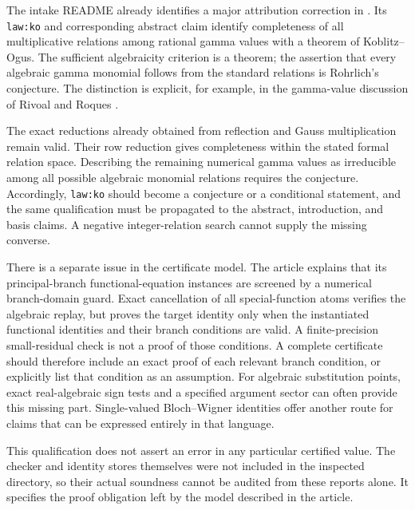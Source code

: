 The intake README already identifies a major attribution correction
in .  Its \texttt{law:ko}
and corresponding abstract claim identify completeness of all
multiplicative relations among rational gamma values with a theorem
of Koblitz--Ogus.  The sufficient algebraicity criterion is a theorem;
the assertion that every algebraic gamma monomial follows from the
standard relations is Rohrlich's conjecture.  The distinction is
explicit, for example, in the gamma-value discussion of
Rivoal and Roques \cite{RivoalRoques2014}.

The exact reductions already obtained from reflection and Gauss
multiplication remain valid.  Their row reduction gives completeness
within the stated formal relation space.  Describing the remaining
numerical gamma values as irreducible among all possible algebraic
monomial relations requires the conjecture.  Accordingly,
\texttt{law:ko} should become a conjecture or a conditional statement,
and the same qualification must be propagated to the abstract,
introduction, and basis claims.  A negative integer-relation search
cannot supply the missing converse.

There is a separate issue in the certificate model.  The article
explains that its principal-branch functional-equation instances
are screened by a numerical branch-domain guard.  Exact cancellation
of all special-function atoms verifies the algebraic replay, but
proves the target identity only when the instantiated functional
identities and their branch conditions are valid.  A finite-precision
small-residual check is not a proof of those conditions.  A complete
certificate should therefore include an exact proof of each relevant
branch condition, or explicitly list that condition as an assumption.
For algebraic substitution points, exact real-algebraic sign tests
and a specified argument sector can often provide this missing part.
Single-valued Bloch--Wigner identities offer another route for claims
that can be expressed entirely in that language.

This qualification does not assert an error in any particular
certified value.  The checker and identity stores themselves were
not included in the inspected directory, so their actual soundness
cannot be audited from these reports alone.  It specifies the proof
obligation left by the model described in the article.
